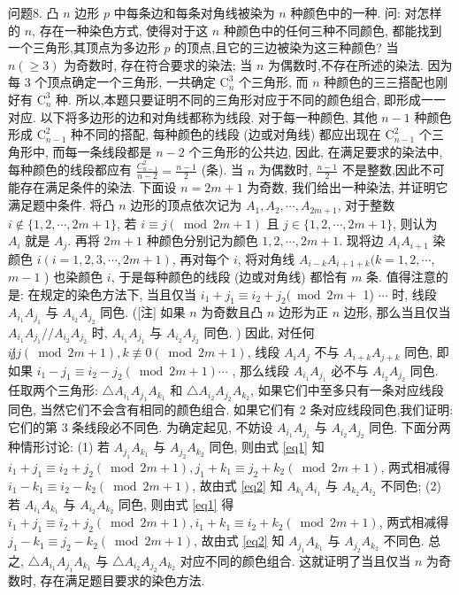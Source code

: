 问题8. 凸 $n$ 边形 $p$ 中每条边和每条对角线被染为 $n$ 种颜色中的一种.
问: 对怎样的 $n$, 存在一种染色方式, 使得对于这 $n$ 种颜色中的任何三种不同颜色, 都能找到一个三角形,其顶点为多边形 $p$ 的顶点,且它的三边被染为这三种颜色?
当 $n(\geqslant 3)$ 为奇数时, 存在符合要求的染法; 当 $n$ 为偶数时,不存在所述的染法.
因为每 3 个顶点确定一个三角形, 一共确定 $\mathrm{C}_n^3$ 个三角形, 而 $n$ 种颜色的三三搭配也刚好有 $\mathrm{C}_n^3$ 种.
所以,本题只要证明不同的三角形对应于不同的颜色组合, 即形成一一对应.
以下将多边形的边和对角线都称为线段.
对于每一种颜色, 其他 $n-1$ 种颜色形成 $\mathrm{C}_{n-1}^2$ 种不同的搭配, 每种颜色的线段 (边或对角线) 都应出现在 $\mathrm{C}_{n-1}^2$ 个三角形中, 而每一条线段都是 $n-2$ 个三角形的公共边, 因此, 在满足要求的染法中, 每种颜色的线段都应有 $\frac{C_{n-1}^2}{n-2}=\frac{n-1}{2}$ (条).
当 $n$ 为偶数时, $\frac{n-1}{2}$ 不是整数,因此不可能存在满足条件的染法.
下面设 $n=2 m+1$ 为奇数, 我们给出一种染法, 并证明它满足题中条件.
将凸 $n$ 边形的顶点依次记为 $A_1, A_2, \cdots, A_{2 m+1}$, 对于整数 $i \notin\{1,2, \cdots, 2 m+1\}$, 若 $i \equiv j(\bmod 2 m+1)$ 且 $j \in\{1,2, \cdots, 2 m+1\}$, 则认为 $A_i$ 就是 $A_j$. 再将 $2 m+1$ 种颜色分别记为颜色 $1,2, \cdots, 2 m+1$. 
现将边 $A_i A_{i+1}$ 染颜色 $i (i=1,2,3, \cdots, 2 m+1)$, 再对每个 $i$, 将对角线 $A_{i-k} A_{i+1+k}(k=1,2, \cdots$, $m-1$ ) 也染颜色 $i$, 于是每种颜色的线段 (边或对角线) 都恰有 $m$ 条.
值得注意的是: 在规定的染色方法下, 当且仅当 $i_1+j_1 \equiv i_2+j_2(\bmod 2 m+$ 1) $\cdots \label{eq1}$  时, 线段 $A_{i_1} A_{j_1}$ 与 $A_{i_2} A_{j_2}$ 同色.
([注] 如果 $n$ 为奇数且凸 $n$ 边形为正 $n$ 边形, 那么当且仅当 $A_{i_1} A_{j_1} / / A_{i_2} A_{j_2}$ 时, $A_{i_1} A_{j_1}$ 与 $A_{i_2} A_{j_2}$ 同色.
) 因此, 对任何 $i \not j j(\bmod 2 m+1), k \not \equiv 0(\bmod 2 m+1)$, 线段 $A_i A_j$ 不与 $A_{i+k} A_{j+k}$ 同色, 即如果 $i_1-j_1 \equiv i_2-j_2(\bmod 2 m+1) \cdots \label{eq2}$ , 
那么线段 $A_{i_1} A_{j_1}$ 必不与 $A_{i_2} A_{j_2}$ 同色.
任取两个三角形: $\triangle A_{i_1} A_{j_1} A_{k_1}$ 和 $\triangle A_{i_2} A_{j_2} A_{k_2}$, 如果它们中至多只有一条对应线段同色, 当然它们不会含有相同的颜色组合.
如果它们有 2 条对应线段同色,我们证明: 它们的第 3 条线段必不同色.
为确定起见, 不妨设 $A_{i_1} A_{j_1}$ 与 $A_{i_2} A_{j_2}$ 同色.
下面分两种情形讨论: 
(1) 若 $A_{j_1} A_{k_1}$ 与 $A_{j_2} A_{k_2}$ 同色, 则由式 \ref{eq1} 知 $i_1+j_1 \equiv i_2+j_2(\bmod 2 m+1), j_1+k_1 \equiv j_2+k_2 (\bmod 2 m+1)$, 两式相减得 $i_1-k_1 \equiv i_2-k_2(\bmod 2 m+1)$, 
故由式 \ref{eq2} 知 $A_{k_1} A_{i_1}$ 与 $A_{k_2} A_{i_2}$ 不同色; 
(2) 若 $A_{i_1} A_{k_1}$ 与 $A_{i_2} A_{k_2}$ 同色, 则由式 \ref{eq1} 得 $i_1+j_1 \equiv i_2+j_2(\bmod 2 m+1), i_1+k_1 \equiv i_2+k_2(\bmod 2 m+1)$, 两式相减得 $j_1-k_1 \equiv j_2-k_2(\bmod 2 m+1)$, 
故由式 \ref{eq2} 知 $A_{j_1} A_{k_1}$ 与 $A_{j_2} A_{k_2}$ 不同色.
总之, $\triangle A_{i_1} A_{j_1} A_{k_1}$ 与 $\triangle A_{i_2} A_{j_2} A_{k_2}$ 对应不同的颜色组合.
这就证明了当且仅当 $n$ 为奇数时, 存在满足题目要求的染色方法.


